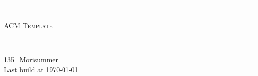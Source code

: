 \begin{titlepage}
	\pagestyle{empty}
	
  \begin{center}
		~\\[80pt]
    \hrule\ \\[8pt]
    \fontsize{48pt}{\baselineskip}\selectfont  \textsc{ACM Template}\\[8pt]
    \hrule\ \\[420pt]

    \huge 135\_Morisummer\\[8pt]
    \Large Last build at \today
  \end{center}
\end{titlepage}
\restoregeometry
